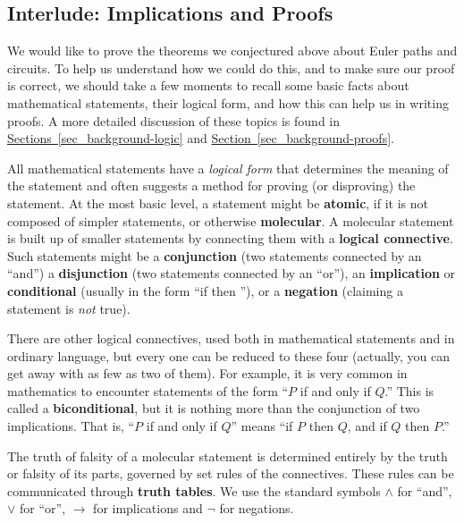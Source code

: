 \documentclass[10pt,]{book}
\newcommand{\terminology}[1]{\textbf{#1}}
\theoremstyle{plain}
\theoremstyle{definition}
\theoremstyle{definition}
\theoremstyle{definition}
\numberwithin{equation}{chapter}
\def\imp{\rightarrow}
\begin{document}
\subsection[{Interlude: Implications and Proofs}]{Interlude: Implications and Proofs}\label{subsection-2}
\hypertarget{p-155}{}%
We would like to prove the theorems we conjectured above about Euler paths and circuits.  To help us understand how we could do this, and to make sure our proof is correct, we should take a few moments to recall some basic facts about mathematical statements, their logical form, and how this can help us in writing proofs.  A more detailed discussion of these topics is found in \hyperref[sec_background-logic]{Sections~\ref{sec_background-logic}} and \hyperref[sec_background-proofs]{Section~\ref{sec_background-proofs}}.%
\par
\hypertarget{p-156}{}%
All mathematical statements have a \emph{logical form} that determines the meaning of the statement and often suggests a method for proving (or disproving) the statement.  At the most basic level, a statement might be \terminology{atomic}, if it is not composed of simpler statements, or otherwise \terminology{molecular}.  A molecular statement is built up of smaller statements by connecting them with a \terminology{logical connective}. Such statements might be a \terminology{conjunction} (two statements connected by an ``and'') a \terminology{disjunction} (two statements connected by an ``or''), an \terminology{implication} or \terminology{conditional} (usually in the form ``if \textellipsis{} then \textellipsis{}''), or a \terminology{negation} (claiming a statement is \emph{not} true).%
\par
\hypertarget{p-157}{}%
There are other logical connectives, used both in mathematical statements and in ordinary language, but every one can be reduced to these four (actually, you can get away with as few as two of them).   For example, it is very common in mathematics to encounter statements of the form ``\(P\) if and only if \(Q\).''  This is called a \terminology{biconditional}, but it is nothing more than the conjunction of two implications.  That is, ``\(P\) if and only if \(Q\)'' means ``if \(P\) then \(Q\), and if \(Q\) then \(P\).''%
\par
\hypertarget{p-158}{}%
The truth of falsity of a molecular statement is determined entirely by the truth or falsity of its parts, governed by set rules of the connectives.  These rules can be communicated through \terminology{truth tables}.  We use the standard symbols \(\wedge\) for ``and'', \(\vee\) for ``or'', \(\imp\) for implications and \(\neg\) for negations.%
\end{document}
